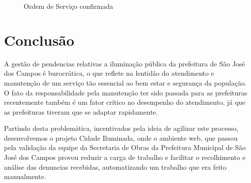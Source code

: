 \documentclass[
	article,			%
	11pt,				%
	oneside,			%
	a4paper,			%
	english,			%
	brazil,				%
	sumario=tradicional
	]{abntex2}
\begin{document}
\begin{figure}[!htbp]
 \centering
 \caption{\label{site-os-confirmada}Ordem de Serviço confirmada}
\end{figure}

\clearpage

%

\section*{Conclusão}

A gestão de pendencias relativas a iluminação pública da prefeitura de São José dos Campos é burocrática, o que reflete na lentidão do atendimento e manutenção de um serviço tão essencial ao bem estar e segurança da população.
O fato da responsabilidade pela manutenção ter sido passada para as prefeituras recentemente também é um fator crítico no desempenho do atendimento, já que as prefeituras tiveram que se adaptar rapidamente.

Partindo desta problemática, incentivados pela ideia de agilizar este processo, desenvolvemos o projeto Cidade Iluminada, onde o ambiente web, que passou pela validação da equipe da Secretaria de Obras da Prefeitura Municipal de São José dos Campos provou reduzir a carga de trabalho e facilitar o recolhimento e análise das denuncias recebidas, automatizando um trabalho que era feito manualmente.
\end{document}

